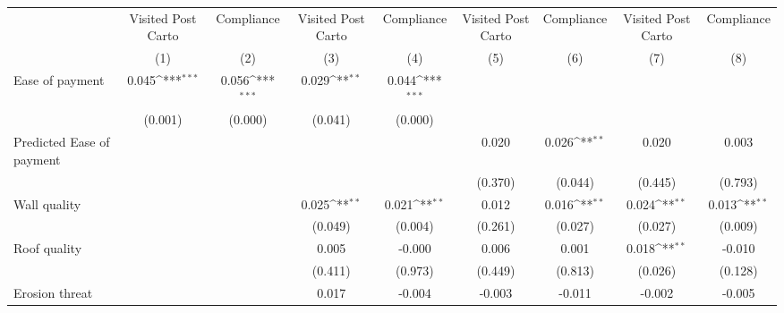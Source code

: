 {
\def\sym#1{\ifmmode^{#1}\else\(^{#1}\)\fi}
\begin{tabular}{l*{8}{c}}
\toprule
                &\multicolumn{1}{c}{Visited Post Carto}&\multicolumn{1}{c}{Compliance}&\multicolumn{1}{c}{Visited Post Carto}&\multicolumn{1}{c}{Compliance}&\multicolumn{1}{c}{Visited Post Carto}&\multicolumn{1}{c}{Compliance}&\multicolumn{1}{c}{Visited Post Carto}&\multicolumn{1}{c}{Compliance}\\
                &\multicolumn{1}{c}{(1)}         &\multicolumn{1}{c}{(2)}         &\multicolumn{1}{c}{(3)}         &\multicolumn{1}{c}{(4)}         &\multicolumn{1}{c}{(5)}         &\multicolumn{1}{c}{(6)}         &\multicolumn{1}{c}{(7)}         &\multicolumn{1}{c}{(8)}         \\
\midrule
Ease of payment &    0.045\sym{***}&    0.056\sym{***}&    0.029\sym{**} &    0.044\sym{***}&                  &                  &                  &                  \\
                &  (0.001)         &  (0.000)         &  (0.041)         &  (0.000)         &                  &                  &                  &                  \\
Predicted Ease of payment&                  &                  &                  &                  &    0.020         &    0.026\sym{**} &    0.020         &    0.003         \\
                &                  &                  &                  &                  &  (0.370)         &  (0.044)         &  (0.445)         &  (0.793)         \\
Wall quality    &                  &                  &    0.025\sym{**} &    0.021\sym{**} &    0.012         &    0.016\sym{**} &    0.024\sym{**} &    0.013\sym{**} \\
                &                  &                  &  (0.049)         &  (0.004)         &  (0.261)         &  (0.027)         &  (0.027)         &  (0.009)         \\
Roof quality    &                  &                  &    0.005         &   -0.000         &    0.006         &    0.001         &    0.018\sym{**} &   -0.010         \\
                &                  &                  &  (0.411)         &  (0.973)         &  (0.449)         &  (0.813)         &  (0.026)         &  (0.128)         \\
Erosion threat  &                  &                  &    0.017         &   -0.004         &   -0.003         &   -0.011         &   -0.002         &   -0.005         \\

\end{tabular}}
